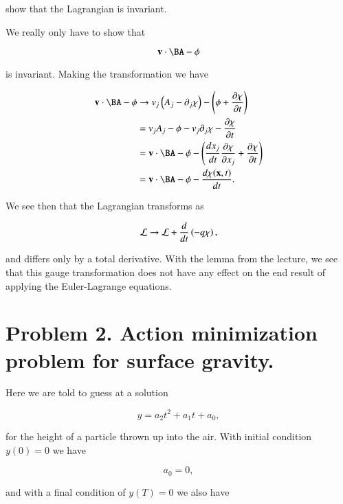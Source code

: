 show that the Lagrangian is invariant.

We really only have to show that 

\begin{equation}\label{eqn:classicalMechanicsPs1:140}
\Bv \cdot \BA - \phi
\end{equation}

is invariant.  Making the transformation we have

\begin{align*}
\Bv \cdot \BA - \phi
&\rightarrow 
v_j \left(A_j - \partial_j \chi \right) - \left(\phi + \PD{t}{\chi} \right) \\
&=
v_j A_j - \phi - v_j \partial_j \chi - \PD{t}{\chi} \\
&=
\Bv \cdot \BA - \phi
- \left( \frac{d x_j}{dt} \PD{x_j}{\chi} + \PD{t}{\chi} \right) \\
&=
\Bv \cdot \BA - \phi
- \frac{d \chi(\Bx, t)}{dt}.
\end{align*}

We see then that the Lagrangian transforms as

\begin{equation}\label{eqn:classicalMechanicsPs1:160}
\mathcal{L} \rightarrow \mathcal{L} + \frac{d}{dt}\left( -q \chi \right),
\end{equation}

and differs only by a total derivative.  With the lemma from the lecture, we see that this gauge transformation does not have any effect on the end result of applying the Euler-Lagrange equations.

\section{Problem 2.  Action minimization problem for surface gravity.}

Here we are told to guess at a solution

\begin{equation}\label{eqn:classicalMechanicsPs1:180}
y = a_2 t^2 + a_1 t + a_0,
\end{equation}

for the height of a particle thrown up into the air.  With initial condition $y(0) = 0$ we have

\begin{equation}\label{eqn:classicalMechanicsPs1:200}
a_0 = 0,
\end{equation}

and with a final condition of $y(T) = 0$ we also have

